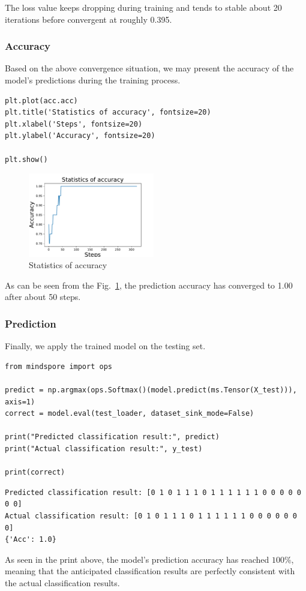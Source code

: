 The loss value keeps dropping during training and tends to stable about 20 iterations before convergent at roughly 0.395.

\subsubsection{Accuracy}
Based on the above convergence situation, we may present the accuracy of the model's predictions during the training process. %

\begin{lstlisting}
plt.plot(acc.acc)
plt.title('Statistics of accuracy', fontsize=20)
plt.xlabel('Steps', fontsize=20)
plt.ylabel('Accuracy', fontsize=20)

plt.show()   
\end{lstlisting}

\begin{figure}[H]
\centering
\includegraphics[width=0.49\textwidth]{5.1_figures/Statistics_of_accuracy.pdf}
\caption{Statistics of accuracy}
\label{5.1Statistics_of_accuracy}
\end{figure}

As can be seen from the Fig.~\ref{5.1Statistics_of_accuracy}, the prediction accuracy has converged to 1.00 after about 50 steps.

\subsubsection{Prediction}
Finally, we apply the trained model on the testing set.
\begin{lstlisting}
from mindspore import ops    

predict = np.argmax(ops.Softmax()(model.predict(ms.Tensor(X_test))), axis=1)    
correct = model.eval(test_loader, dataset_sink_mode=False)                   

print("Predicted classification result:", predict)
print("Actual classification result:", y_test)                                               

print(correct)                                                               
\end{lstlisting}

\begin{lstlisting}
Predicted classification result: [0 1 0 1 1 1 0 1 1 1 1 1 1 0 0 0 0 0 0 0]
Actual classification result: [0 1 0 1 1 1 0 1 1 1 1 1 1 0 0 0 0 0 0 0]
{'Acc': 1.0}
\end{lstlisting}

As seen in the print above, the model's prediction accuracy has reached $100\%$, meaning that the anticipated classification results are perfectly consistent with the actual classification results.


